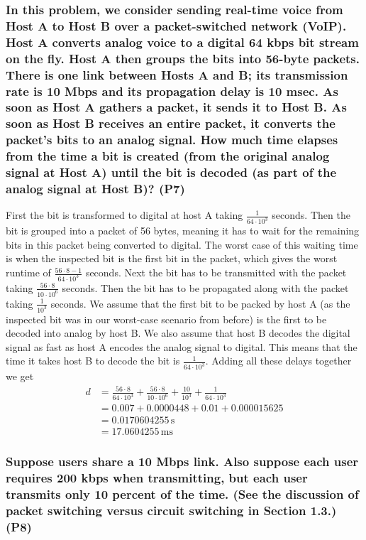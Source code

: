 \subsubsection{In this problem, we consider sending real-time voice from Host A to Host B over a packet-switched network (VoIP). Host A converts analog voice to a digital 64 kbps bit stream on the fly. Host A then groups the bits into 56-byte packets. There is one link between Hosts A and B; its transmission rate is 10 Mbps and its propagation delay is 10 msec. As soon as Host A gathers a packet, it sends it to Host B. As soon as Host B receives an entire packet, it converts the packet’s bits to an analog signal. How much time elapses from the time a bit is created (from the original analog signal at Host A) until the bit is decoded (as part of the analog signal at Host B)? (P7)}

First the bit is transformed to digital at host A taking $\frac{1}{64 \cdot 10^3}$ seconds. Then the bit is grouped into a packet of 56 bytes, meaning it has to wait for the remaining bits in this packet being converted to digital. The worst case of this waiting time is when the inspected bit is the first bit in the packet, which gives the worst runtime of $\frac{56 \cdot 8 - 1}{64 \cdot 10^3}$ seconds. Next the bit has to be transmitted with the packet taking $\frac{56 \cdot 8}{10 \cdot 10^6}$ seconds. Then the bit has to be propagated along with the packet taking $\frac{1}{10^3}$ seconds. We assume that the first bit to be packed by host A (as the inspected bit was in our worst-case scenario from before) is the first to be decoded into analog by host B. We also assume that host B decodes the digital signal as fast as host A encodes the analog signal to digital. This means that the time it takes host B to decode the bit is $\frac{1}{64 \cdot 10^3}$. Adding all these delays together we get 
\begin{equation*}
\begin{split}
    d &= \frac{56 \cdot 8}{64 \cdot 10^3} + \frac{56 \cdot 8}{10 \cdot 10^6} + \frac{10}{10^3} + \frac{1}{64 \cdot 10^3} \\
    &= 0.007 + 0.0000448 + 0.01 + 0.000015625 \\
    &= 0.0170604255 \, \text{s} \\
    &= 17.0604255 \, \text{ms}
\end{split}
\end{equation*}

\subsubsection{Suppose users share a 10 Mbps link. Also suppose each user requires 200 kbps when transmitting, but each user transmits only 10 percent of the time. (See the discussion of packet switching versus circuit switching in Section 1.3.) (P8)}

